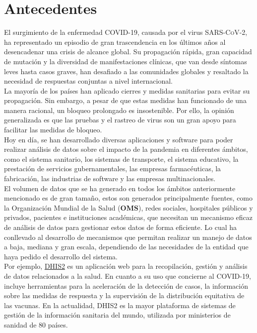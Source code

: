 \section{Antecedentes}\label{hipótesis}


El surgimiento de la enfermedad \textsc{COVID-19}, causada por el virus \textsc{SARS-CoV-2}, ha representado un episodio de gran trascendencia en los últimos años al desencadenar una crisis de alcance global. Su propagación rápida, gran capacidad de mutación y la diversidad de manifestaciones clínicas, que van desde síntomas leves hasta casos graves, han desafiado a las comunidades globales y resaltado la necesidad de respuestas conjuntas a nivel internacional.\\
La mayoría de los países han aplicado cierres y medidas sanitarias para evitar su propagación. Sin embargo, a pesar de que estas medidas han funcionado de una manera racional, un bloqueo prolongado es insostenible. Por ello, la opinión generalizada es que las pruebas y el rastreo de virus son un gran apoyo para facilitar las medidas de bloqueo.\\

Hoy en día, se han desarrollado diversas aplicaciones y software para poder realizar análisis de datos sobre el impacto de la pandemia en diferentes ámbitos, como el sistema sanitario, los sistemas de transporte, el sistema educativo, la prestación de servicios gubernamentales, las empresas farmacéuticas, la fabricación, las industrias de software y las empresas multinacionales.\\

El volumen de datos que se ha generado en todos los ámbitos anteriormente mencionado es de gran tamaño, estos son generados principalmente fuentes, como la Organización Mundial de la Salud (\textbf{OMS}), redes sociales, hospitales públicos y privados, pacientes e instituciones académicas, que necesitan un mecanismo eficaz de análisis de datos para gestionar estos datos de forma eficiente. Lo cual ha conllevado al desarrollo de mecanismos que permitan realizar un manejo de datos a baja, mediana y gran escala, dependiendo de las necesidades de la entidad que haya pedido el desarrollo del sistema.\\
Por ejemplo, \href{https://dhis2.org/covid-19/}{DHIS2} es un aplicación web para la recopilación, gestión y análisis de datos relacionados a la salud. En cuanto a su uso que concierne al \textsc{COVID-19}, incluye herramientas para la aceleración de la detección de casos, la información sobre las medidas de respuesta y la supervisión de la distribución equitativa de las vacunas. En la actualidad, \textsc{DHIS2} es la mayor plataforma de sistemas de gestión de la información sanitaria del mundo, utilizada por ministerios de sanidad de 80 países.\\

